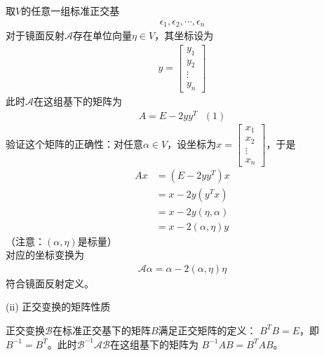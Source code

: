 \documentclass{article}
\begin{document}
取$V$的任意一组标准正交基
\begin{align*}
  \epsilon_1, \epsilon_2, \cdots, \epsilon_n
\end{align*}
对于镜面反射$\mathscr{A}$存在单位向量$\eta \in V$，其坐标设为
\begin{align*}
  y = \begin{bmatrix}
        y_1    \\
        y_2    \\
        \vdots \\
        y_n
      \end{bmatrix}
\end{align*}
此时$\mathscr{A}$在这组基下的矩阵为
\begin{align*}
  A = E - 2 y y^T \ \ \ (1)
\end{align*}
验证这个矩阵的正确性：对任意$\alpha \in V$，设坐标为$x = \begin{bmatrix}
    x_1    \\
    x_2    \\
    \vdots \\
    x_n
  \end{bmatrix}$，于是
\begin{align*}
  A x & = (E - 2 y y^T) x        \\
      & = x - 2 y (y^T x)        \\
      & = x - 2 y (\eta, \alpha) \\
      & = x - 2 (\alpha, \eta) y
\end{align*}
（注意：$(\alpha, \eta)$是标量）\\
对应的坐标变换为
\begin{align*}
  \mathscr{A} \alpha = \alpha - 2 (\alpha, \eta) \eta
\end{align*}
符合镜面反射定义。

(ii) 正交变换的矩阵性质

正交变换$\mathscr{B}$在标准正交基下的矩阵$B$满足正交矩阵的定义：
$B^T B = E$，即$B^{-1} = B^T$。此时$\mathscr{B}^{-1} \mathscr{A} \mathscr{B}$在这组基下的矩阵为
$B^{-1} A B = B^T A B$。
\end{document}

